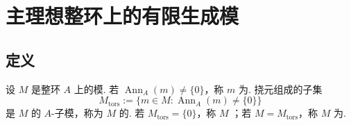 \section{主理想整环上的有限生成模}\label{sec:galois-1-10}
\subsection{定义}\label{sec:galois-1-10-1}
\begin{definition*}
设 $M$ 是整环 $A$ 上的模. 若 $\operatorname{Ann}_A(m)\ne\{0\}$，称 $m$ 为. 挠元组成的子集
\[M_{\mathrm{tors}}:=\{m\in M:\operatorname{Ann}_A(m)\ne\{0\}\}\]
是 $M$ 的 $A$-子模，称为 $M$ 的. 若 $M_{\mathrm{tors}}=\{0\}$，称 $M$ ；若 $M=M_{\mathrm{tors}}$，称 $M$ 为.
\end{definition*}
